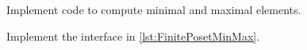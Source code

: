 

\begin{codeexercise}
    Implement code to compute minimal and maximal elements.

    Implement the interface in \cref{lst:FinitePosetMinMax}.
\end{codeexercise}


